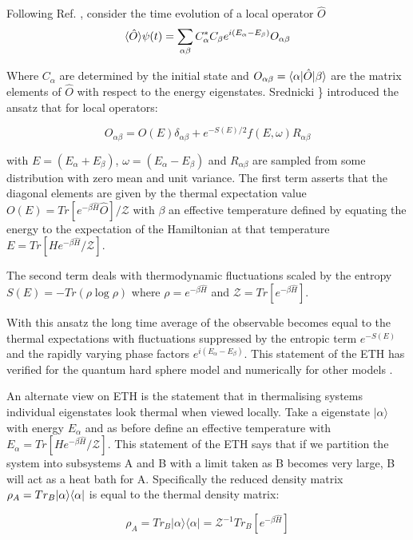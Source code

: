 Following Ref. \textcite{abanin_recent_2017}, consider the time evolution of a local operator \(\hat{O}\) \[ \langle \hat{O} \rangle{\psi(t)} = \sum_{\alpha \beta} C^*_\alpha C_\beta e^{i(E_\alpha - E_\beta)} O_{\alpha \beta}\]

Where \(C_\alpha\) are determined by the initial state and \(O_{\alpha \beta} = \langle \alpha | \hat{O} | \beta \rangle\) are the matrix elements of \(\hat{O}\) with respect to the energy eigenstates. Srednicki \textcite{srednicki_chaos_1994}\} introduced the ansatz that for local operators:

\[O_{\alpha \beta} = O(E)\delta_{\alpha\beta} + e^{-S(E)/2} f(E,\omega) R_{\alpha\beta}\]

with \(E = (E_\alpha + E_\beta)\), \(\omega = (E_\alpha - E_\beta)\) and \(R_{\alpha\beta}\) are sampled from some distribution with zero mean and unit variance. The first term asserts that the diagonal elements are given by the thermal expectation value \(O(E) = Tr[e^{-\beta \hat{H}} \hat{O}]/\mathcal{Z}\) with \(\beta\) an effective temperature defined by equating the energy to the expectation of the Hamiltonian at that temperature \(E = Tr[H e^{-\beta \hat{H}}/\mathcal{Z}]\).

The second term deals with thermodynamic fluctuations scaled by the entropy \(S(E) = -Tr(\rho \log \rho)\) where \(\rho = e^{-\beta \hat{H}}\) and \(\mathcal{Z} = Tr[e^{-\beta \hat{H}}]\).

With this ansatz the long time average of the observable becomes equal to the thermal expectations with fluctuations suppressed by the entropic term \(e^{-S(E)}\) and the rapidly varying phase factors \(e^{i(E_\alpha - E_\beta)}\). This statement of the ETH has verified for the quantum hard sphere model \textcite{srednicki_chaos_1994} and numerically for other models \autocite{khatami_fluctuation-dissipation_2013,dalessio_quantum_2016}.

An alternate view on ETH is the statement that in thermalising systems individual eigenstates look thermal when viewed locally. Take a eigenstate \(|\alpha\rangle\) with energy \(E_\alpha\) and as before define an effective temperature with \(E_\alpha = Tr[H e^{-\beta \hat{H}}/\mathcal{Z}]\). This statement of the ETH says that if we partition the system into subsystems A and B with a limit taken as B becomes very large, B will act as a heat bath for A. Specifically the reduced density matrix \(\rho_A = Tr_B |\alpha\rangle \langle\alpha|\) is equal to the thermal density matrix:

\[\rho_A = Tr_B |\alpha\rangle \langle \alpha| = \mathcal{Z}^{-1} Tr_B [e^{-\beta \hat{H}}] \]

